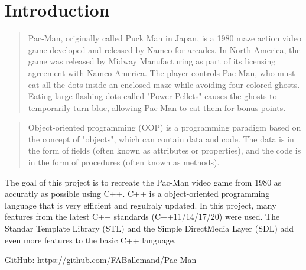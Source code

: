 \section{Introduction}

\begin{quote}
    Pac-Man, originally called Puck Man in Japan, is a 1980 maze action video game developed and released by Namco for arcades. In North America, the game was released by Midway Manufacturing as part of its licensing agreement with Namco America. The player controls Pac-Man, who must eat all the dots inside an enclosed maze while avoiding four colored ghosts. Eating large flashing dots called "Power Pellets" causes the ghosts to temporarily turn blue, allowing Pac-Man to eat them for bonus points.\cite{pacman_wiki}
\end{quote}

\begin{quote}
    Object-oriented programming (OOP) is a programming paradigm based on the concept of "objects", which can contain data and code. The data is in the form of fields (often known as attributes or properties), and the code is in the form of procedures (often known as methods).\cite{oop_wiki}
\end{quote}

The goal of this project is to recreate the Pac-Man video game from 1980 as accuratly as possible using C++.
C++ is a object-oriented programming language that is very efficient and regulraly updated. In this project, many features from the latest C++ standards (C++11/14/17/20) were used.
The Standar Template Library (STL)\cite{stl_wiki} and the Simple DirectMedia Layer (SDL)\cite{sdl} add even more features to the basic C++ language.

GitHub: \url{https://github.com/FABallemand/Pac-Man}